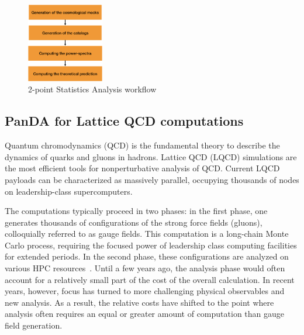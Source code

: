 \documentclass{webofc}
\begin{document}
\begin{figure}
  \centering
  \includegraphics[width=0.30\textwidth]{figures/LSST_2point_statistics.png}
  \caption{2-point Statistics Analysis workflow}
  \label{fig:lsst_desc_2pt_stats}
\end{figure}


\subsection{PanDA for Lattice QCD computations} \label{section_lqcd}

Quantum chromodynamics (QCD) is the fundamental theory to describe the dynamics of quarks and gluons in hadrons.
Lattice QCD (LQCD) simulations are the most efficient tools for nonperturbative analysis of QCD.
Current LQCD payloads can be characterized as massively parallel, occupying thousands of nodes on leadership-class supercomputers. 

The computations typically proceed in two phases: in the first phase, one generates thousands of configurations of the strong force fields (gluons), colloquially referred to as gauge fields. 
This computation is a long-chain Monte Carlo process, requiring the focused power of leadership class computing facilities for extended periods. In the second phase, these configurations are analyzed on various HPC resources~\cite{Babich:2011np}.
Until a few years ago, the analysis phase would often account for a relatively small part of the cost of the overall calculation. In recent years, however, focus has turned to more challenging physical observables and new analysis. As a result, the relative costs have shifted to the point where analysis often requires an equal or greater amount of computation than gauge field generation.
\end{document}
